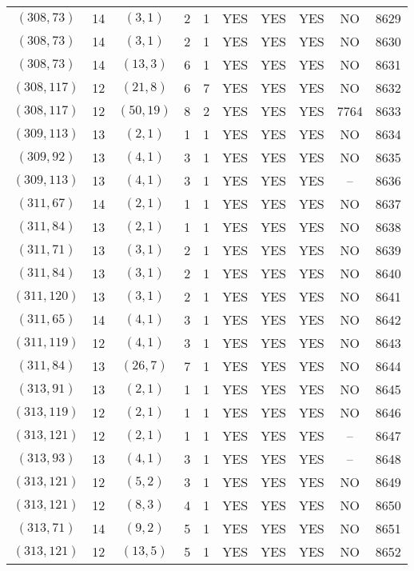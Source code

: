 \begin{longtable}{|c|c|c|c|c|c|c|c|c|c|}
$(308, 73)$ & 14 & $(3, 1)$ & 2 & 1 & YES & YES & YES & NO & 8629\\
$(308, 73)$ & 14 & $(3, 1)$ & 2 & 1 & YES & YES & YES & NO & 8630\\
$(308, 73)$ & 14 & $(13, 3)$ & 6 & 1 & YES & YES & YES & NO & 8631\\
$(308, 117)$ & 12 & $(21, 8)$ & 6 & 7 & YES & YES & YES & NO & 8632\\
$(308, 117)$ & 12 & $(50, 19)$ & 8 & 2 & YES & YES & YES & 7764 & 8633\\
$(309, 113)$ & 13 & $(2, 1)$ & 1 & 1 & YES & YES & YES & NO & 8634\\
$(309, 92)$ & 13 & $(4, 1)$ & 3 & 1 & YES & YES & YES & NO & 8635\\
$(309, 113)$ & 13 & $(4, 1)$ & 3 & 1 & YES & YES & YES & -- & 8636\\
$(311, 67)$ & 14 & $(2, 1)$ & 1 & 1 & YES & YES & YES & NO & 8637\\
$(311, 84)$ & 13 & $(2, 1)$ & 1 & 1 & YES & YES & YES & NO & 8638\\
$(311, 71)$ & 13 & $(3, 1)$ & 2 & 1 & YES & YES & YES & NO & 8639\\
$(311, 84)$ & 13 & $(3, 1)$ & 2 & 1 & YES & YES & YES & NO & 8640\\
$(311, 120)$ & 13 & $(3, 1)$ & 2 & 1 & YES & YES & YES & NO & 8641\\
$(311, 65)$ & 14 & $(4, 1)$ & 3 & 1 & YES & YES & YES & NO & 8642\\
$(311, 119)$ & 12 & $(4, 1)$ & 3 & 1 & YES & YES & YES & NO & 8643\\
$(311, 84)$ & 13 & $(26, 7)$ & 7 & 1 & YES & YES & YES & NO & 8644\\
$(313, 91)$ & 13 & $(2, 1)$ & 1 & 1 & YES & YES & YES & NO & 8645\\
$(313, 119)$ & 12 & $(2, 1)$ & 1 & 1 & YES & YES & YES & NO & 8646\\
$(313, 121)$ & 12 & $(2, 1)$ & 1 & 1 & YES & YES & YES & -- & 8647\\
$(313, 93)$ & 13 & $(4, 1)$ & 3 & 1 & YES & YES & YES & -- & 8648\\
$(313, 121)$ & 12 & $(5, 2)$ & 3 & 1 & YES & YES & YES & NO & 8649\\
$(313, 121)$ & 12 & $(8, 3)$ & 4 & 1 & YES & YES & YES & NO & 8650\\
$(313, 71)$ & 14 & $(9, 2)$ & 5 & 1 & YES & YES & YES & NO & 8651\\
$(313, 121)$ & 12 & $(13, 5)$ & 5 & 1 & YES & YES & YES & NO & 8652\\

\end{longtable}
